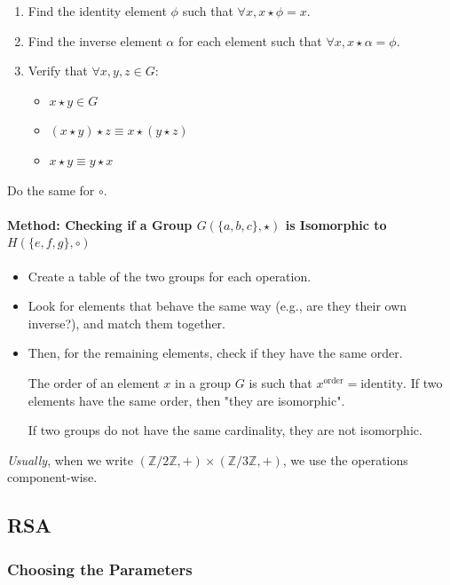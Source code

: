 \documentclass{article}
\begin{document}
\begin{enumerate}
    \item Find the identity element \( \phi \) such that \( \forall x, x \star \phi = x \).
    \item Find the inverse element \( \alpha \) for each element such that \( \forall x, x \star \alpha = \phi \).
    \item Verify that \( \forall x, y, z \in G \):
    \begin{itemize}
        \item \( x \star y \in G \)
        \item \( (x \star y) \star z \equiv x \star (y \star z) \)
        \item \( x \star y \equiv y \star x \)
    \end{itemize}
\end{enumerate}

Do the same for \( \circ \).

\paragraph{Method: Checking if a Group \( G(\{a, b, c\}, \star) \) is Isomorphic to \( H(\{e, f, g\}, \circ) \)}

\begin{itemize}
    \item Create a table of the two groups for each operation.
    \item Look for elements that behave the same way (e.g., are they their own inverse?), and match them together.
    \item Then, for the remaining elements, check if they have the same order.

    The order of an element \( x \) in a group \( G \) is such that \( x^{\text{order}} = \text{identity} \). If two elements have the same order, then "they are isomorphic".

    If two groups do not have the same cardinality, they are not isomorphic.
\end{itemize}
\textit{Usually}, when we write \( (\mathbb{Z}/2\mathbb{Z}, +) \times (\mathbb{Z}/3\mathbb{Z}, +) \), we use the operations component-wise.

\newpage

\subsection{RSA}

\subsubsection{Choosing the Parameters}
\end{document}

